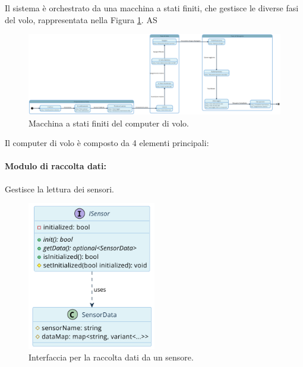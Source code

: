 \documentclass[12pt,a4paper,twoside]{book}
\begin{document}
Il sistema è orchestrato da una macchina a stati finiti, che gestisce le diverse
fasi del volo, rappresentata nella Figura \ref{fig:flight-computer-fsm}. AS
\ifdefined\HCode
\else
    \begin{landscape}
        \fi
        \begin{figure}[H]
            \centering
            \vspace*{2cm}  %
            \hspace*{-4cm}
            \includegraphics[width=1.7\textwidth]{img/uml/fsm.png}
            \caption{Macchina a stati finiti del computer di volo.}
            \label{fig:flight-computer-fsm}
            \vspace*{-1cm}  %
        \end{figure}
        \thispagestyle{empty}  %
        \ifdefined\HCode
        \else
    \end{landscape}
\fi

\newpage
Il computer di volo è composto da 4 elementi principali:
\paragraph{\textbf{Modulo di raccolta dati:}} Gestisce la lettura dei sensori.
\begin{figure}[H]
    \centering
    \includegraphics[width=0.5\textwidth]{img/uml/sensor.png}
    \caption{Interfaccia per la raccolta dati da un sensore.}
    \label{fig:flight-computer-data-collection}
\end{figure}
\end{document}
